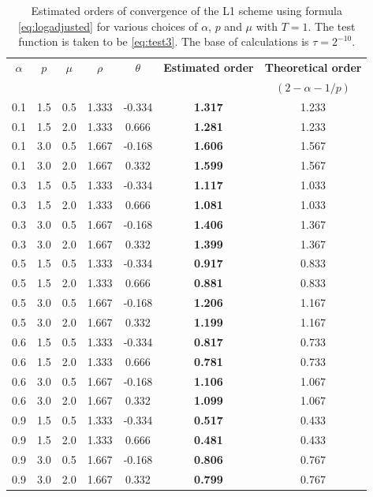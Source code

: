 \documentclass[12pt,a4paper]{article}
\theoremstyle{definition}
\begin{document}
\begin{table}[h]
\centering
\begin{tabular}{ccccccc}
\hline
$\alpha$ & $p$ & $\mu$ & $\rho$ & $\theta$ & \textbf{Estimated order} & \textbf{Theoretical order} \\
 & & & & & & $(2 - \alpha - 1/p)$ \\
\hline
0.1 & 1.5 & 0.5 & 1.333 & -0.334 & \textbf{1.317} & 1.233 \\
0.1 & 1.5 & 2.0 & 1.333 & 0.666 & \textbf{1.281} & 1.233 \\
0.1 & 3.0 & 0.5 & 1.667 & -0.168 & \textbf{1.606} & 1.567 \\
0.1 & 3.0 & 2.0 & 1.667 & 0.332 & \textbf{1.599} & 1.567 \\
\hline
0.3 & 1.5 & 0.5 & 1.333 & -0.334 & \textbf{1.117} & 1.033 \\
0.3 & 1.5 & 2.0 & 1.333 & 0.666 & \textbf{1.081} & 1.033 \\
0.3 & 3.0 & 0.5 & 1.667 & -0.168 & \textbf{1.406} & 1.367 \\
0.3 & 3.0 & 2.0 & 1.667 & 0.332 & \textbf{1.399} & 1.367 \\
\hline
0.5 & 1.5 & 0.5 & 1.333 & -0.334 & \textbf{0.917} & 0.833 \\
0.5 & 1.5 & 2.0 & 1.333 & 0.666 & \textbf{0.881} & 0.833 \\
0.5 & 3.0 & 0.5 & 1.667 & -0.168 & \textbf{1.206} & 1.167 \\
0.5 & 3.0 & 2.0 & 1.667 & 0.332 & \textbf{1.199} & 1.167 \\
\hline
0.6 & 1.5 & 0.5 & 1.333 & -0.334 & \textbf{0.817} & 0.733 \\
0.6 & 1.5 & 2.0 & 1.333 & 0.666 & \textbf{0.781} & 0.733 \\
0.6 & 3.0 & 0.5 & 1.667 & -0.168 & \textbf{1.106} & 1.067 \\
0.6 & 3.0 & 2.0 & 1.667 & 0.332 & \textbf{1.099} & 1.067 \\
\hline
0.9 & 1.5 & 0.5 & 1.333 & -0.334 & \textbf{0.517} & 0.433 \\
0.9 & 1.5 & 2.0 & 1.333 & 0.666 & \textbf{0.481} & 0.433 \\
0.9 & 3.0 & 0.5 & 1.667 & -0.168 & \textbf{0.806} & 0.767 \\
0.9 & 3.0 & 2.0 & 1.667 & 0.332 & \textbf{0.799} & 0.767 \\
\hline
\end{tabular}
\caption{Estimated orders of convergence of the L1 scheme using formula \eqref{eq:logadjusted} for various choices of $\alpha$, $p$ and $\mu$ with $T = 1$. The test function is taken to be \eqref{eq:test3}. The base of calculations is $\tau = 2^{-10}$.}
\label{tab:tab4}
\end{table}
\end{document}
